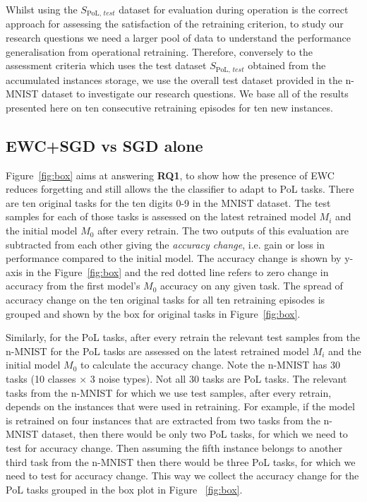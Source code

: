 %
%
Whilst using the $S_{\text{PoL, }test}$ dataset for evaluation during operation is the correct approach for assessing the satisfaction of the retraining criterion, to study our research questions we need a larger pool of data to understand the performance generalisation from operational retraining.
%
Therefore, conversely to the assessment criteria which uses the test dataset $S_{\text{PoL, }test}$ obtained from the accumulated instances storage, we use the overall test dataset provided in the n-MNIST dataset to investigate our research questions.
%
%
%
We base all of the results presented here on ten consecutive retraining episodes for ten new instances.

\subsection{EWC+SGD vs SGD alone}
Figure~\ref{fig:box} aims at answering \textbf{RQ1}, to show how the presence of EWC reduces forgetting and still allows the the classifier to adapt to PoL tasks.
%
There are ten original tasks for the ten digits 0-9 in the MNIST dataset. 
%
The test samples for each of those tasks is assessed on the latest retrained model $M_i$ and the initial model $M_0$ after every retrain. 
%
The two outputs of this evaluation are subtracted from each other giving the \textit{accuracy change}, i.e. gain or loss in performance compared to the initial model. 
%
The accuracy change is shown by y-axis in the Figure~\ref{fig:box} and the red dotted line refers to zero change in accuracy from the first model's $M_0$ accuracy on any given task. 
% 
The spread of accuracy change on the ten original tasks for all ten retraining episodes is grouped and shown by the box for original tasks in Figure~\ref{fig:box}.

Similarly, for the PoL tasks, after every retrain the relevant test samples from the n-MNIST for the PoL tasks are assessed on the latest retrained model $M_i$ and the initial model $M_0$ to calculate the accuracy change.
%
Note the n-MNIST has 30 tasks (10 classes $\times$ 3 noise types). 
%
Not all 30 tasks are PoL tasks. 
%
The relevant tasks from the n-MNIST for which we use test samples, after every retrain, depends on the instances that were used in retraining. 
%
For example, if the model is retrained on four instances that are extracted from two tasks from the n-MNIST dataset, then there would be only two PoL tasks, for which we need to test for accuracy change. 
%
Then assuming the fifth instance belongs to another third task from the n-MNIST then there would be three PoL tasks, for which we need to test for accuracy change.  
%
This way we collect the accuracy change for the PoL tasks grouped in the box plot in Figure ~\ref{fig:box}.

